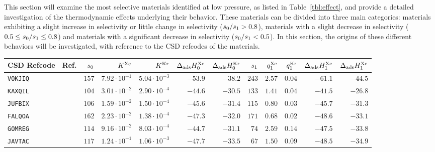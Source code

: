 \documentclass[main.tex]{subfiles}
\begin{document}
This section will examine the most selective materials identified at low pressure, as listed in Table~\ref{tbl:effect}, and provide a detailed investigation of the thermodynamic effects underlying their behavior. These materials can be divided into three main categories: materials exhibiting a slight increase in selectivity or little change in selectivity ($s_{\text{0}}/s_{\text{1}} > 0.8$), materials with a slight decrease in selectivity ($0.5 \le s_{\text{0}}/s_{\text{1}} \le 0.8$) and materials with a significant decrease in selectivity ($s_{\text{0}}/s_{\text{1}} < 0.5$). In this section, the origins of these different behaviors will be investigated, with reference to the CSD refcodes of the materials.

  
\begin{table}[hb]
  \centering
  \fontsize{8.5}{10.5}\selectfont
  \setlength{\extrarowheight}{1pt}
    \begin{tabular}{|lr|rrrrr|rrrrr|}
    \hline
          CSD Refcode & Ref. &  $s_{\text{0}}$ &  $K^{\text{Xe}}$ &  $K^{\text{Kr}}$ &  $\Delta_{\text{ads}}H^{\text{Xe}}_{\text{0}}$ &  $\Delta_{\text{ads}}H^{\text{Kr}}_{\text{0}}$  &  $s_{\text{1}}$ &  $q^{\text{Xe}}_{\text{1}}$ &  $q^{\text{Kr}}_{\text{1}}$ &  $\Delta_{\text{ads}}H^{\text{Xe}}_{\text{1}}$ &  $\Delta_{\text{ads}}H^{\text{Xe}}_{\text{1}}$ \\
    \hline
        \texttt{VOKJIQ} & \cite{VOKJIQ}        &  $157$  &  $7.92\cdot10^{-1}$  &  $5.04\cdot10^{-3}$  &  $-53.9$  &  $-38.2$  &  $243$  &  $2.57$  &  $0.04$  &  $-61.1$  &  $-44.5$  \\
        \texttt{KAXQIL} & \cite{KAXQIL}        &  $104$  &  $3.01\cdot10^{-2}$  &  $2.90\cdot10^{-4}$  &  $-44.6$  &  $-30.5$  &  $133$  &  $1.41$  &  $0.04$  &  $-41.5$  &  $-26.8$  \\
        \texttt{JUFBIX} & \cite{JUFBIX}        &  $106$  &  $1.59\cdot10^{-2}$  &  $1.50\cdot10^{-4}$  &  $-45.6$  &  $-31.4$  &  $115$  &  $0.80$  &  $0.03$  &  $-45.7$  &  $-31.3$  \\
        \texttt{FALQOA} & \cite{FALQOA}        &  $162$  &  $2.23\cdot10^{-2}$  &  $1.38\cdot10^{-4}$  &  $-47.3$  &  $-32.0$  &  $171$  &  $0.68$  &  $0.02$  &  $-48.6$  &  $-33.1$  \\
        \texttt{GOMREG} & \cite{GOMREG_GOMRAC} &  $114$  &  $9.16\cdot10^{-2}$  &  $8.03\cdot10^{-4}$  &  $-44.7$  &  $-31.1$  &  $ 74$  &  $2.59$  &  $0.14$  &  $-47.5$  &  $-33.8$  \\
        \texttt{JAVTAC} & \cite{JAVTAC}        &  $117$  &  $1.24\cdot10^{-1}$  &  $1.06\cdot10^{-3}$  &  $-47.7$  &  $-33.5$  &  $ 67$  &  $1.50$  &  $0.09$  &  $-48.5$  &  $-34.9$  \\

\end{tabular}
\end{table}
\end{document}
